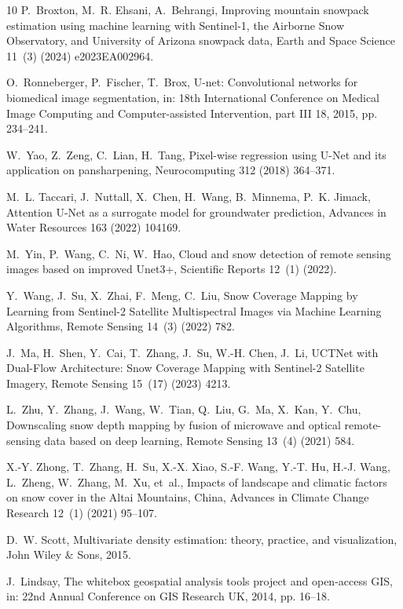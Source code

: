 \documentclass[preprint,12pt]{elsarticle}
\begin{document}
\begin{thebibliography}{10}
P.~Broxton, M.~R. Ehsani, A.~Behrangi, {Improving mountain snowpack estimation using machine learning with Sentinel-1, the Airborne Snow Observatory, and University of Arizona snowpack data}, Earth and Space Science 11~(3) (2024) e2023EA002964.

O.~Ronneberger, P.~Fischer, T.~Brox, {U-net: Convolutional networks for biomedical image segmentation}, in: 18th International Conference on Medical Image Computing and Computer-assisted Intervention, part III 18, 2015, pp. 234--241.

W.~Yao, Z.~Zeng, C.~Lian, H.~Tang, {Pixel-wise regression using U-Net and its application on pansharpening}, Neurocomputing 312 (2018) 364--371.

M.~L. Taccari, J.~Nuttall, X.~Chen, H.~Wang, B.~Minnema, P.~K. Jimack, {Attention U-Net as a surrogate model for groundwater prediction}, Advances in Water Resources 163 (2022) 104169.

M.~Yin, P.~Wang, C.~Ni, W.~Hao, {Cloud and snow detection of remote sensing images based on improved Unet3+}, Scientific Reports 12~(1) (2022).

Y.~Wang, J.~Su, X.~Zhai, F.~Meng, C.~Liu, {Snow Coverage Mapping by Learning from Sentinel-2 Satellite Multispectral Images via Machine Learning Algorithms}, Remote Sensing 14~(3) (2022) 782.

J.~Ma, H.~Shen, Y.~Cai, T.~Zhang, J.~Su, W.-H. Chen, J.~Li, {UCTNet with Dual-Flow Architecture: Snow Coverage Mapping with Sentinel-2 Satellite Imagery}, Remote Sensing 15~(17) (2023) 4213.

L.~Zhu, Y.~Zhang, J.~Wang, W.~Tian, Q.~Liu, G.~Ma, X.~Kan, Y.~Chu, Downscaling snow depth mapping by fusion of microwave and optical remote-sensing data based on deep learning, Remote Sensing 13~(4) (2021) 584.

X.-Y. Zhong, T.~Zhang, H.~Su, X.-X. Xiao, S.-F. Wang, Y.-T. Hu, H.-J. Wang, L.~Zheng, W.~Zhang, M.~Xu, et~al., {Impacts of landscape and climatic factors on snow cover in the Altai Mountains, China}, Advances in Climate Change Research 12~(1) (2021) 95--107.

D.~W. Scott, Multivariate density estimation: theory, practice, and visualization, John Wiley \& Sons, 2015.

J.~Lindsay, {The whitebox geospatial analysis tools project and open-access GIS}, in: 22nd Annual Conference on GIS Research UK, 2014, pp. 16--18.


\end{thebibliography}
\end{document}
